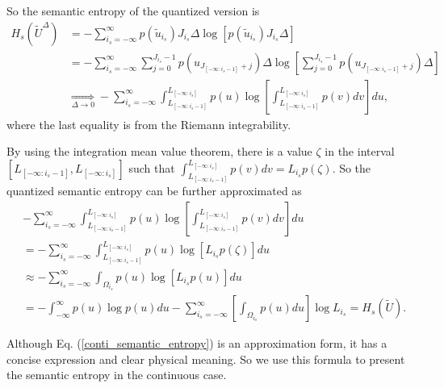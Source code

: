 \documentclass[12pt, draftclsnofoot,onecolumn]{IEEEtran}
\begin{document}
So the semantic entropy of the quantized version is
\begin{equation}
\begin{aligned}
H_s(\tilde{U}^{\Delta})&=-\sum_{i_s=-\infty}^{\infty} p(\tilde{u}_{i_s})J_{i_s}\Delta \log \left[p(\tilde{u}_{i_s})J_{i_s}\Delta\right]\\
&=-\sum_{i_s=-\infty}^{\infty}\sum_{j=0}^{J_{i_s}-1} p(u_{J_{[-\infty:i_s-1]}+j})\Delta \log \left[\sum_{j=0}^{J_{i_s}-1} p(u_{J_{[-\infty:i_s-1]}+j})\Delta\right]\\
&\underset{\Delta \to 0}{\mathop{\Rightarrow }} -\sum_{i_s=-\infty}^{\infty}\int_{L_{[-\infty:i_s-1]}}^{L_{[-\infty:i_s]}} p(u) \log \left[\int_{L_{[-\infty:i_s-1]}}^{L_{[-\infty:i_s]}} p(v)dv\right]du,
\end{aligned}
\end{equation}
where the last equality is from the Riemann integrability.

By using the integration mean value theorem, there is a value $\zeta$ in the interval $\left[L_{[-\infty:i_s-1]},L_{[-\infty:i_s]}\right]$ such that $\int_{L_{[-\infty:i_s-1]}}^{L_{[-\infty:i_s]}} p(v)dv=L_{i_s}p(\zeta) $. So the quantized semantic entropy can be further approximated as
\begin{equation}
\begin{aligned}
&-\sum_{i_s=-\infty}^{\infty}\int_{L_{[-\infty:i_s-1]}}^{L_{[-\infty:i_s]}} p(u) \log \left[\int_{L_{[-\infty:i_s-1]}}^{L_{[-\infty:i_s]}} p(v)dv\right]du \\
&= -\sum_{i_s=-\infty}^{\infty}\int_{L_{[-\infty:i_s-1]}}^{L_{[-\infty:i_s]}} p(u) \log \left[L_{i_s} p(\zeta)\right]du \\
&\approx -\sum_{i_s=-\infty}^{\infty}\int_{\Omega_{i_s}} p(u) \log \left[L_{i_s} p(u)\right]du \\
&=-\int_{-\infty}^{\infty} p(u)\log p(u) du -\sum_{i_s=-\infty}^{\infty}\left[ \int_{\Omega_{i_s}} p(u) du \right] \log L_{i_s} =H_s(\tilde{U}).
\end{aligned}
\end{equation}

Although Eq. (\ref{conti_semantic_entropy}) is an approximation form, it has a concise expression and clear physical meaning. So we use this formula to present the semantic entropy in the continuous case.
\end{document}
